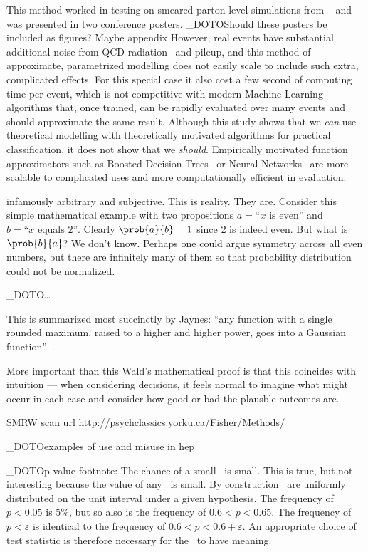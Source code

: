 This method worked in testing on smeared parton-level simulations from
\madgraph~\cite{Alwall:2014hca} and was presented in two conference posters.
\NO_DOTO{Should these posters be included as figures? Maybe appendix}
However, real events have substantial additional noise from QCD
radiation~\cite{PhysRevD.83.074010} and pileup, and this method of approximate,
parametrized modelling does not easily scale to include such extra, complicated
effects.
For this special case it also cost a few second of computing time per event,
which is not competitive with modern Machine Learning algorithms that, once
trained, can be rapidly evaluated over many events and should approximate
the same result.
Although this study shows that we \emph{can} use theoretical modelling
with theoretically motivated algorithms for practical classification, it does
not show that we \emph{should}.
Empirically motivated function approximators such as
Boosted Decision Trees~\cite{xgboost} or
Neural Networks~\cite{MurphyKevinP.2012Mlap} are more scalable to complicated
uses and more computationally efficient in evaluation.


infamously arbitrary and subjective. This is reality. They are.
Consider this simple mathematical example with two propositions
$a=\textrm{``}x\textrm{ is even''}$ and
$b=\textrm{``}x\textrm{ equals }2\textrm{''}$.
Clearly $\prob{a}{b} = 1$ since $2$ is indeed even.
But what is $\prob{b}{a}$? We don't know. Perhaps one could argue symmetry
across all even numbers, but there are infinitely many of them so that
probability distribution could not be normalized.

\NO_DOTO{\ldots}

This is summarized most succinctly by Jaynes:
``any function with a single rounded maximum, raised to a higher and higher
power, goes into a Gaussian function''~\cite{jaynes2003probability}.


More important than this Wald's mathematical proof is that this coincides with
intuition --- when considering decisions, it feels normal to imagine what might
occur in each case and consider how good or bad the plausble outcomes are.

SMRW scan url http://psychclassics.yorku.ca/Fisher/Methods/


\NO_DOTO{examples of use and misuse in hep}

\NO_DOTO{p-value footnote:
The chance of a small \pvalue\ is small.
This is true, but not interesting because the value of any \pvalue\ is small.
By construction \pvalues\ are uniformly distributed on the unit interval
under a given hypothesis.
The frequency of $p < 0.05$ is $5\%$, but so also is the frequency of
$0.6 < p < 0.65$.
The frequency of $p < \varepsilon$ is identical to the frequency
of $0.6 < p < 0.6 + \varepsilon$.
An appropriate choice of test statistic is therefore necessary for the
\pvalue\ to have meaning.
}

